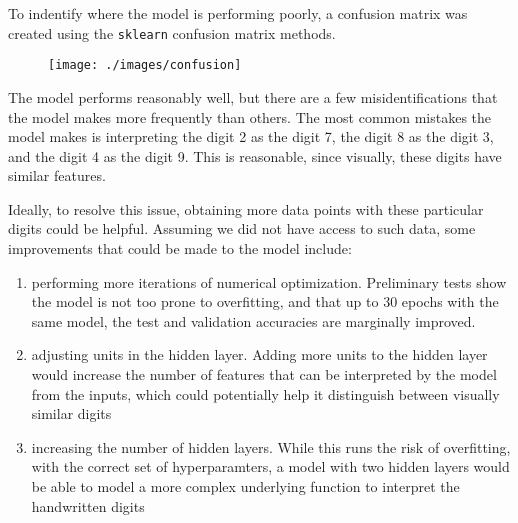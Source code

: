 \newpage
{}
To indentify where the model is performing poorly, a confusion matrix was created using the \verb+sklearn+ confusion matrix methods.

\begin{figure}
\begin{center}
\texttt{[image: ./images/confusion]}
\end{center}
\end{figure}

The model performs reasonably well, but there are a few misidentifications that the model makes more frequently than others. The most common mistakes the model makes is interpreting the digit 2 as the digit 7, the digit 8 as the digit 3, and the digit 4 as the digit 9. This is reasonable, since visually, these digits have similar features.

Ideally, to resolve this issue, obtaining more data points with these particular digits could be helpful. Assuming we did not have access to such data, some improvements that could be made to the model include:

\begin{enumerate}
\item performing more iterations of numerical optimization. Preliminary tests show the model is not too prone to overfitting, and that up to 30 epochs with the same model, the test and validation accuracies are marginally improved.
\item adjusting units in the hidden layer. Adding more units to the hidden layer would increase the number of features that can be interpreted by the model from the inputs, which could potentially help it distinguish between visually similar digits
\item increasing the number of hidden layers. While this runs the risk of overfitting, with the correct set of hyperparamters, a model with two hidden layers would be able to model a more complex underlying function to interpret the handwritten digits
\end{enumerate}











